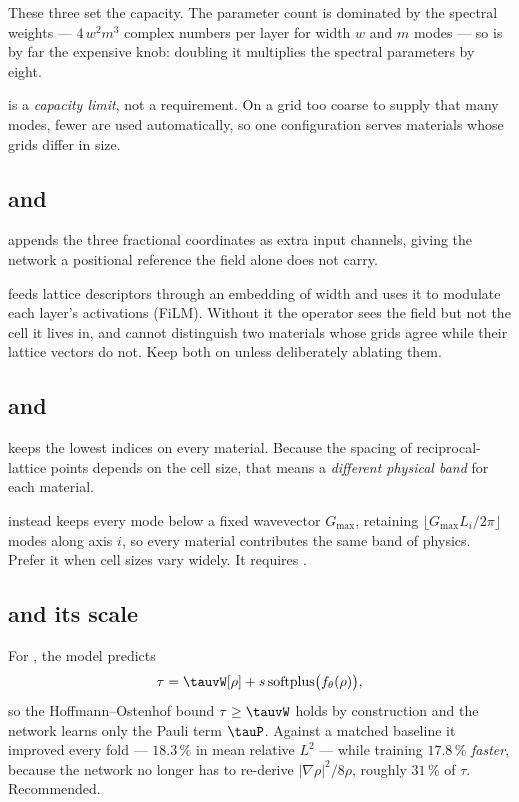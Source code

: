 These three set the capacity. The parameter count is dominated by the spectral
weights --- $4\,w^{2}m^{3}$ complex numbers per layer for width $w$ and
$m$ modes --- so  is by far the expensive knob: doubling it
multiplies the spectral parameters by eight.

\begin{ptip}
 is a \emph{capacity limit}, not a requirement. On a grid too coarse
to supply that many modes, fewer are used automatically, so one configuration
serves materials whose grids differ in size.
\end{ptip}

\subsection{ and }

 appends the three fractional coordinates as extra input
channels, giving the network a positional reference the field alone does not
carry.

 feeds lattice descriptors through an embedding of
width  and uses it to modulate each layer's activations
(FiLM). Without it the operator sees the field but not the cell it lives in,
and cannot distinguish two materials whose grids agree while their lattice
vectors do not. Keep both on unless deliberately ablating them.

\subsection{ and }

 keeps the lowest  indices on every material. Because the
spacing of reciprocal-lattice points depends on the cell size, that means a
\emph{different physical band} for each material.

 instead keeps every mode below a fixed wavevector $G_{\max}$,
retaining $\lfloor G_{\max} L_i / 2\pi \rfloor$ modes along axis $i$, so every
material contributes the same band of physics. Prefer it when cell sizes vary
widely. It requires .

\subsection{ and its scale}

For , the model predicts
\[
  \tau = \tauvW[\rho] + s\,\mathrm{softplus}\bigl(f_\theta(\rho)\bigr),
\]
so the Hoffmann--Ostenhof bound $\tau \ge \tauvW$ holds by construction and the
network learns only the Pauli term $\tauP$. Against a matched baseline it
improved every fold --- $18.3\,\%$ in mean relative $L^{2}$ --- while training
$17.8\,\%$ \emph{faster}, because the network no longer has to re-derive
$|\nabla\rho|^{2}/8\rho$, roughly $31\,\%$ of $\tau$. Recommended.

